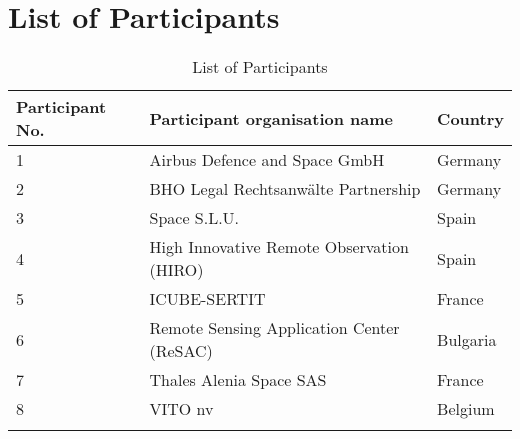 \chapter{List of Participants}

\begin{longtable}[H]{l p{9cm} p{2cm}}
	
	\toprule[2pt]
	
	\textbf{Participant No.} & \textbf{Participant organisation name} & \textbf{Country} \\
	
	\midrule[1.5pt] 
	\endhead
	
	1 & Airbus Defence and Space GmbH & Germany \vspace{0.2cm} \\
	
	\midrule

	2 & BHO Legal Rechtsanwälte Partnership & Germany \vspace{0.2cm} \\
	
	\midrule
	
	3 &  Space S.L.U. & Spain \vspace{0.2cm} \\

	\midrule

 	4 & High Innovative Remote Observation (HIRO) & Spain \vspace{0.2cm} \\
 	
 	\midrule
 	
 	5 & ICUBE-SERTIT & France \vspace{0.2cm} \\
 	
 	\midrule
 	
 	6 & Remote Sensing Application Center (ReSAC) & Bulgaria \vspace{0.2cm} \\
 	
 	\midrule
 	
 	7 & Thales Alenia Space SAS & France \vspace{0.2cm} \\
 	
 	\midrule
 	
 	8 & VITO nv & Belgium \vspace{0.2cm} \\
	
	\bottomrule[2pt]
	
	\caption{List of Participants}
	\label{Participants}
\end{longtable}